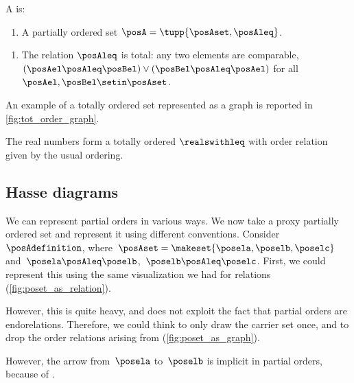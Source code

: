 \begin{ctdefinition}
    \label{def:total-order}
    A  is:

    \constit
    \begin{enumerate}
        \item A partially ordered set $\posA = \tupp{\posAset,\posAleq}$.
    \end{enumerate}

    \condit
    \begin{enumerate}
        \item The relation $\posAleq$ is total: any two elements are comparable,
              $(\posAel \posAleq \posBel) \vee (\posBel \posAleq \posAel)$ for all $\posAel, \posBel \setin \posAset$.
    \end{enumerate}
\end{ctdefinition}

An example of a totally ordered set represented as a graph is reported in \cref{fig:tot_order_graph}.


\begin{example}[Reals]
    The real numbers \reals form a totally ordered  $\realswithleq$ with order relation given by the usual ordering.
\end{example}


\subsection{Hasse diagrams}
We can represent partial orders in various ways.
We now take a proxy partially ordered set and represent it using different conventions.
Consider~$\posAdefinition$, where~$\posAset=\makeset{\posela,\poselb,\poselc}$ and~$\posela\posAleq \poselb$,~$\poselb\posAleq \poselc$.
First, we could represent this using the same visualization we had for relations (\cref{fig:poset_as_relation}).

However, this is quite heavy, and does not exploit the fact that partial orders are endorelations.
Therefore, we could think to only draw the carrier set once, and to drop the order relations arising from  (\cref{fig:poset_as_graph}).

However, the arrow from~$\posela$ to~$\poselb$ is implicit in partial orders, because of .

